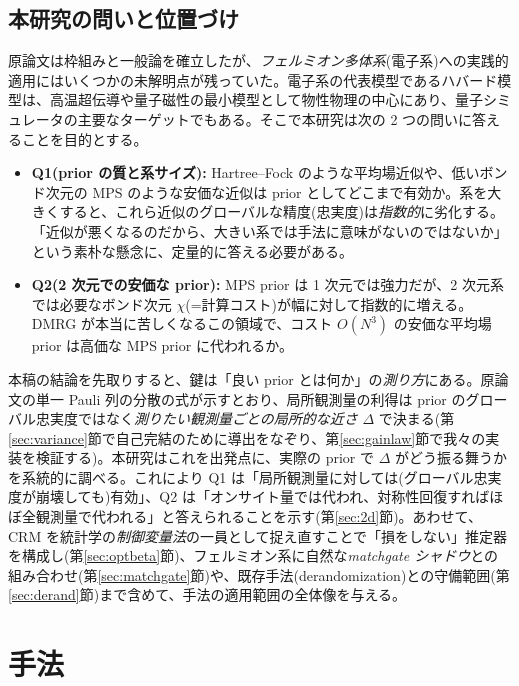 \documentclass[11pt,a4paper]{ltjsarticle}
\begin{document}
\subsection{本研究の問いと位置づけ}
\label{sec:questions}
原論文は枠組みと一般論を確立したが、\emph{フェルミオン多体系}(電子系)への実践的適用にはいくつかの未解明点が残っていた。電子系の代表模型であるハバード模型は、高温超伝導や量子磁性の最小模型として物性物理の中心にあり、量子シミュレータの主要なターゲットでもある。そこで本研究は次の 2 つの問いに答えることを目的とする。
\begin{itemize}
  \item \textbf{Q1(prior の質と系サイズ):} Hartree--Fock のような平均場近似や、低いボンド次元の MPS のような安価な近似は prior としてどこまで有効か。系を大きくすると、これら近似のグローバルな精度(忠実度)は\emph{指数的}に劣化する。「近似が悪くなるのだから、大きい系では手法に意味がないのではないか」という素朴な懸念に、定量的に答える必要がある。
  \item \textbf{Q2(2 次元での安価な prior):} MPS prior は 1 次元では強力だが、2 次元系では必要なボンド次元 $\chi$(=計算コスト)が幅に対して指数的に増える。DMRG が本当に苦しくなるこの領域で、コスト $O(N^3)$ の安価な平均場 prior は高価な MPS prior に代われるか。
\end{itemize}
本稿の結論を先取りすると、鍵は「良い prior とは何か」の\emph{測り方}にある。原論文の単一 Pauli 列の分散の式が示すとおり、局所観測量の利得は prior のグローバル忠実度ではなく\emph{測りたい観測量ごとの局所的な近さ} $\Delta$ で決まる(第\ref{sec:variance}節で自己完結のために導出をなぞり、第\ref{sec:gainlaw}節で我々の実装を検証する)。本研究はこれを出発点に、実際の prior で $\Delta$ がどう振る舞うかを系統的に調べる。これにより Q1 は「局所観測量に対しては(グローバル忠実度が崩壊しても)有効」、Q2 は「オンサイト量では代われ、対称性回復すればほぼ全観測量で代われる」と答えられることを示す(第\ref{sec:2d}節)。あわせて、CRM を統計学の\emph{制御変量法}の一員として捉え直すことで「損をしない」推定器を構成し(第\ref{sec:optbeta}節)、フェルミオン系に自然な\emph{matchgate シャドウ}との組み合わせ(第\ref{sec:matchgate}節)や、既存手法(derandomization)との守備範囲(第\ref{sec:derand}節)まで含めて、手法の適用範囲の全体像を与える。

\section{手法}
\label{sec:methods}
\end{document}
